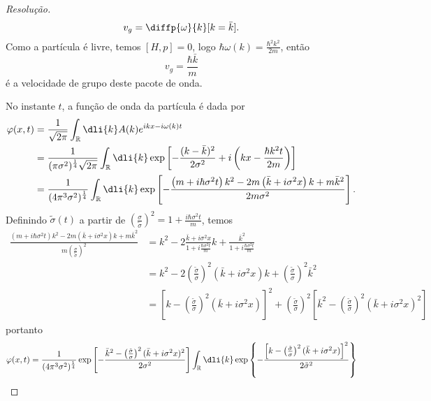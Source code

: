 \begin{proof}[Resolução]
    \begin{equation*}
        v_g = \diffp{\omega}{k}[k=\bar{k}].
    \end{equation*}
    Como a partícula é livre, temos \([H, p] = 0\), logo \(\hbar\omega(k) = \frac{\hbar^2 k^2}{2m}\), então
    \begin{equation*}
        v_g = \frac{\hbar \bar{k}}{m}
    \end{equation*}
    é a velocidade de grupo deste pacote de onda.

    No instante \(t\), a função de onda da partícula é dada por
    \begin{align*}
        \varphi(x,t) &= \frac{1}{\sqrt{2\pi}} \int_{\mathbb{R}} \dli{k} A(k) e^{ikx - i \omega(k)t}\\
                     &= \frac{1}{(\pi \sigma^2)^{\frac14}\sqrt{2\pi}} \int_{\mathbb{R}} \dli{k} \exp\left[-\frac{(k - \bar{k})^2}{2 \sigma^2} + i \left(k x - \frac{\hbar k^2t}{2m}\right)\right]\\
                     &= \frac{1}{(4\pi^3 \sigma^2)^{\frac14}} \int_{\mathbb{R}} \dli{k} \exp\left[-\frac{\left(m + i\hbar \sigma^2 t\right)k^2 - 2m\left(\bar{k} + i\sigma^2 x\right)k + m\bar{k}^2}{2 m\sigma^2}\right].
    \end{align*}
    Definindo \(\tilde{\sigma}(t)\) a partir de \(\left(\frac{\sigma}{\tilde{\sigma}}\right)^2 = 1 + \frac{i\hbar \sigma^2 t}{m}\), temos
    \begin{align*}
        \frac{(m + i\hbar \sigma^2 t)k^2 - 2m(\bar{k} + i \sigma^2 x)k + m\bar{k}^2}{m\left(\frac{\sigma}{\tilde{\sigma}}\right)^2}
        &= k^2 - 2\frac{\bar{k} + i \sigma^2 x}{1 + i\frac{\hbar \sigma^2 t}{m}}k + \frac{\bar{k}^2}{1 + i\frac{\hbar \sigma^2 t}{m}}\\
        &= k^2 - 2\left(\frac{\tilde{\sigma}}{\sigma}\right)^2(\bar{k} + i \sigma^2 x)k + \left(\frac{\tilde{\sigma}}{\sigma}\right)^2 \bar{k}^2\\
        &= \left[k - \left(\frac{\tilde{\sigma}}{\sigma}\right)^2 (\bar{k} + i \sigma^2 x)\right]^2 + \left(\frac{\tilde{\sigma}}{\sigma}\right)^2\left[\bar{k}^2 - \left(\frac{\tilde{\sigma}}{\sigma}\right)^2(\bar{k} + i \sigma^2 x)^2\right]
    \end{align*}
    portanto
    \begin{align*}
        \varphi(x,t) &= \frac{1}{(4\pi^3 \sigma^2)^{\frac14}}\exp\left[-\frac{\bar{k}^2 - \left(\frac{\tilde{\sigma}}{\sigma}\right)^2 ( \bar{k} + i \sigma^2 x)^2}{2 \sigma^2}\right]\int_{\mathbb{R}} \dli{k}\exp\left\{-\frac{\left[k - \left(\frac{\tilde{\sigma}}{\sigma}\right)^2 (\bar{k}+ i \sigma^2 x)\right]^2}{2 \tilde{\sigma}^2}\right\}\\

\end{align*}
\end{proof}
